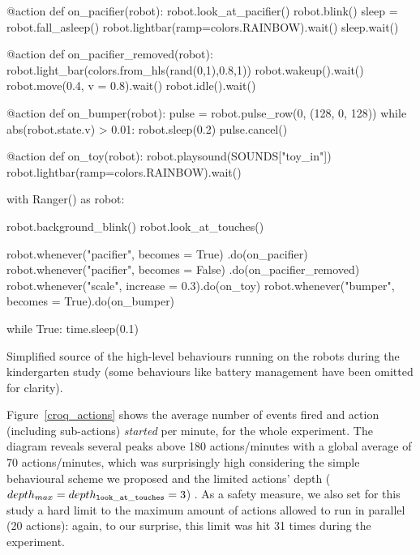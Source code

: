 \documentclass[a4paper, 10pt, conference]{ieeeconf}      %
\begin{document}
\begin{listing}[h!]

\begin{pythoncode}
    @action
    def on_pacifier(robot):
        robot.look_at_pacifier()
        robot.blink()
        sleep = robot.fall_asleep()
        robot.lightbar(ramp=colors.RAINBOW).wait()
        sleep.wait()
    
    @action
    def on_pacifier_removed(robot):
        robot.light_bar(colors.from_hls(rand(0,1),0.8,1))
        robot.wakeup().wait()
        robot.move(0.4, v = 0.8).wait()
        robot.idle().wait()
    
    @action
    def on_bumper(robot):
        pulse = robot.pulse_row(0, (128, 0, 128))
        while abs(robot.state.v) > 0.01:
            robot.sleep(0.2)
        pulse.cancel()
    
    @action
    def on_toy(robot):
        robot.playsound(SOUNDS["toy_in"])
        robot.lightbar(ramp=colors.RAINBOW).wait()
    
    with Ranger() as robot:
    
        robot.background_blink()
        robot.look_at_touches()
    
        robot.whenever("pacifier", becomes = True)
                                    .do(on_pacifier)
        robot.whenever("pacifier", becomes = False)
                                    .do(on_pacifier_removed)
        robot.whenever("scale", increase = 0.3).do(on_toy)
        robot.whenever("bumper", becomes = True).do(on_bumper)
    
        while True:
            time.sleep(0.1)
\end{pythoncode}
\caption{Simplified source of the high-level behaviours running on the robots during the
kindergarten study (some behaviours like battery management have been omitted for
clarity).}
\label{croquignole_no_move}
\end{listing}

Figure~\ref{croq_actions} shows the average number of events fired and action
(including sub-actions) \emph{started} per minute, for the whole experiment. The
diagram reveals several peaks above 180 actions/minutes with a global average of
70 actions/minutes, which was surprisingly high considering the simple
behavioural scheme we proposed and the limited actions' depth
($depth_{max}=depth_{\tt look\_at\_touches}=3$) . As a safety measure, we also
set for this study a hard limit to the maximum amount of actions allowed to run
in parallel (20 actions): again, to our surprise, this limit was hit 31 times
during the experiment.
\end{document}
